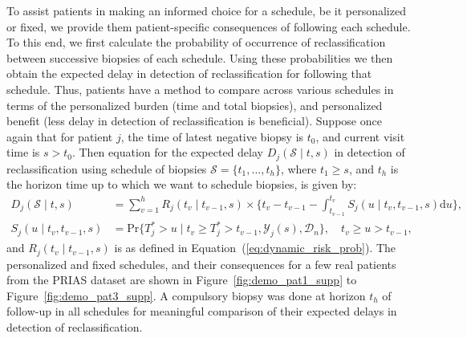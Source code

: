 To assist patients in making an informed choice for a schedule, be it personalized or fixed, we provide them patient-specific consequences of following each schedule. To this end, we first calculate the probability of occurrence of reclassification between successive biopsies of each schedule. Using these probabilities we then obtain the expected delay in detection of reclassification for following that schedule. Thus, patients have a method to compare across various schedules in terms of the personalized burden (time and total biopsies), and personalized benefit (less delay in detection of reclassification is beneficial). Suppose once again that for patient $j$, the time of latest negative biopsy is $t_0$, and current visit time is $s > t_0$. Then equation for the expected delay $D_j(\mathcal{S} \mid t,s)$ in detection of reclassification using schedule of biopsies $\mathcal{S} = \{t_1, \ldots, t_h\}$, where $t_1 \geq s$, and $t_h$ is the horizon time up to which we want to schedule biopsies, is given by:
\begin{equation}
\label{eq:expected_delay}
\begin{split}
D_j(\mathcal{S} \mid t,s) &= \sum_{v=1}^{h} R_j(t_v\mid t_{v-1},s) \times  \Big\{t_{v} - t_{v-1} - \int_{t_{v-1}}^{t_v} S_j(u \mid t_v, t_{v-1}, s) \mathrm{d}u \Big\},\\
S_j(u \mid t_v, t_{v-1}, s) &= \mbox{Pr}\big\{T^*_j > u \mid t_{v} \geq T^*_j > t_{v-1}, \mathcal{Y}_{j}(s), \mathcal{D}_n\big\}, \quad t_{v} \geq u > t_{v-1},
\end{split}
\end{equation}
and $R_j(t_v\mid t_{v-1},s)$ is as defined in Equation~(\ref{eq:dynamic_risk_prob}). The personalized and fixed schedules, and their consequences for a few real patients from the PRIAS dataset are shown in Figure~\ref{fig:demo_pat1_supp} to Figure~\ref{fig:demo_pat3_supp}. A compulsory biopsy was done at horizon $t_h$ of follow-up in all schedules for meaningful comparison of their expected delays in detection of reclassification.

